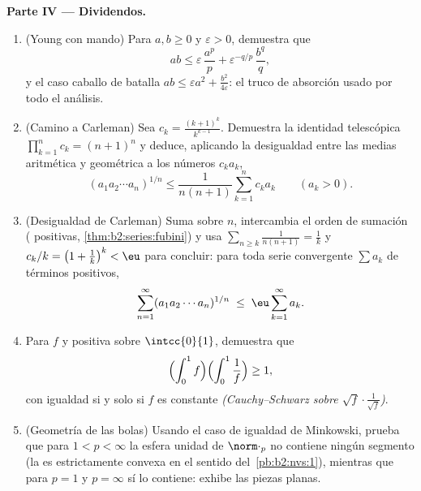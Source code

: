 \begin{problem}
\medskip
\noindent\textbf{Parte IV --- Dividendos.}
\begin{enumerate}[resume]
  \item (Young con mando) Para $a, b \geq 0$ y $\varepsilon > 0$,
        demuestra que
        \[
        ab \leq \varepsilon\,\frac{a^p}{p} +
        \varepsilon^{-q/p}\,\frac{b^q}{q},
        \]
        y el caso caballo de batalla $ab \leq \varepsilon a^2 +
        \frac{b^2}{4\varepsilon}$: el truco de absorción usado por
        todo el análisis.
  \item (Camino a Carleman) Sea $c_k = \frac{(k+1)^k}{k^{k-1}}$.
        Demuestra la identidad telescópica $\prod_{k=1}^{n}c_k =
        (n+1)^n$ y deduce, aplicando la desigualdad entre las medias
        aritmética y geométrica a los números $c_ka_k$,
        \[
        (a_1a_2\cdots a_n)^{1/n} \leq
        \frac{1}{n(n+1)}\sum_{k=1}^{n} c_k a_k
        \qquad (a_k > 0).
        \]
  \item (Desigualdad de Carleman) Suma sobre $n$, intercambia el
        orden de sumación ( positivas,
        \cref{thm:b2:series:fubini}) y usa $\sum_{n \geq
        k}\frac{1}{n(n+1)} = \frac1k$ y $c_k/k = \bigl(1 +
        \frac1k\bigr)^k < \eu$ para concluir: para toda serie
        convergente $\sum a_k$ de términos positivos,
        \[
        \sum_{n=1}^{\infty}(a_1a_2\cdots a_n)^{1/n}
        \;\leq\; \eu\sum_{k=1}^{\infty}a_k .
        \]
  \item Para $f$  y positiva sobre $\intcc{0}{1}$,
        demuestra que
        \[
        \Bigl(\int_0^1 f\Bigr)\Bigl(\int_0^1\frac1f\Bigr)
        \geq 1,
        \]
        con igualdad si y solo si $f$ es constante
        \emph{(Cauchy--Schwarz sobre $\sqrt f\cdot\frac1{\sqrt
        f}$)}.
  \item (Geometría de las bolas) Usando el caso de igualdad de
        Minkowski, prueba que para $1 < p < \infty$ la esfera
        unidad de $\norm\cdot_p$ no contiene ningún segmento (la
         es estrictamente convexa en el sentido del~\cref{pb:b2:nvs:1}), mientras que para $p = 1$ y $p =
        \infty$ sí lo contiene: exhibe las piezas planas.
\end{enumerate}


\end{problem}

